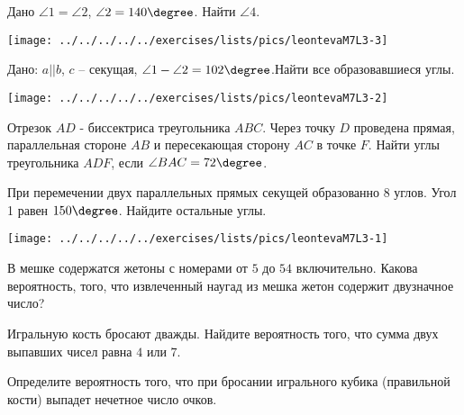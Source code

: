 \begin{class}[number=3]
	\begin{listofex}
		\item 
		\begin{minipage}[t]{\bodywidth}
			Дано \( \angle 1 = \angle 2 \), \( \angle 2=140\degree \). Найти \( \angle 4 \).
		\end{minipage}
		\hspace{0.02\linewidth}
		\begin{minipage}[t]{\picwidth}
			\texttt{[image: ../../../../../exercises/lists/pics/leontevaM7L3-3]}
		\end{minipage}
		\begin{minipage}[t]{\bodywidth}
			\item Дано: \( a || b \), \( c \) – секущая, \( \angle 1 - \angle 2 = 102\degree \).Найти все образовавшиеся углы.
		\end{minipage}
		\hspace{0.02\linewidth}
		\begin{minipage}[t]{\picwidth}
			\texttt{[image: ../../../../../exercises/lists/pics/leontevaM7L3-2]}
		\end{minipage}
		\item Отрезок \( AD \) - биссектриса треугольника \( ABC \). Через точку \( D \) проведена прямая, параллельная стороне \( AB \) и пересекающая сторону \( AC \) в точке \( F \).
		Найти углы треугольника \( ADF \), если \( \angle BAC=72\degree \).
		\item 
		\begin{minipage}[t]{\bodywidth}
			При перемечении двух параллельных прямых секущей образованно 8 углов. Угол 1 равен \( 150\degree \). Найдите остальные углы.
		\end{minipage}
		\hspace{0.02\linewidth}
		\begin{minipage}[t]{\picwidth}
			\texttt{[image: ../../../../../exercises/lists/pics/leontevaM7L3-1]}
		\end{minipage}
		\item В мешке содержатся жетоны с номерами от \( 5 \) до \( 54 \) включительно. Какова вероятность, того, что извлеченный наугад из мешка жетон содержит двузначное число?
		\item Игральную кость бросают дважды. Найдите вероятность того, что сумма двух выпавших чисел равна \( 4 \) или \( 7 \).
		\item Определите вероятность того, что при бросании игрального кубика (правильной кости) выпадет нечетное число очков.

\end{listofex}
\end{class}
